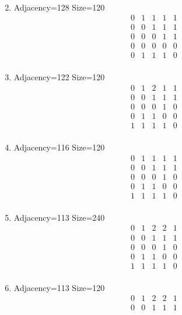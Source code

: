 \documentclass[12pt]{article}
\begin{document}
\begin{multicols}{3}
\begin{enumerate}
\begin{equation*}
\begin{array}{ccccc}
\end{array}
\end{equation*}
\item Adjacency=128 Size=120
\begin{equation*}
\begin{array}{ccccc}
0&1&1&1&1\\
0&0&1&1&1\\
0&0&0&1&1\\
0&0&0&0&0\\
0&1&1&1&0\\
\end{array}
\end{equation*}
\item Adjacency=122 Size=120
\begin{equation*}
\begin{array}{ccccc}
0&1&2&1&1\\
0&0&1&1&1\\
0&0&0&1&0\\
0&1&1&0&0\\
1&1&1&1&0\\
\end{array}
\end{equation*}
\item Adjacency=116 Size=120
\begin{equation*}
\begin{array}{ccccc}
0&1&1&1&1\\
0&0&1&1&1\\
0&0&0&1&0\\
0&1&1&0&0\\
1&1&1&1&0\\
\end{array}
\end{equation*}
\item Adjacency=113 Size=240
\begin{equation*}
\begin{array}{ccccc}
0&1&2&2&1\\
0&0&1&1&1\\
0&0&0&1&0\\
0&1&1&0&0\\
1&1&1&1&0\\
\end{array}
\end{equation*}
\item Adjacency=113 Size=120
\begin{equation*}
\begin{array}{ccccc}
0&1&2&2&1\\
0&0&1&1&1\\

\end{array}
\end{equation*}
\end{enumerate}
\end{multicols}
\end{document}
